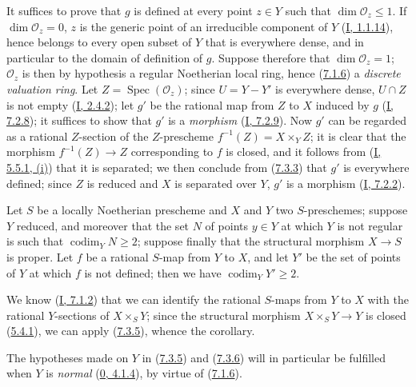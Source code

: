 It suffices to prove that $g$ is defined at every point $z\in Y$ such that
$\dim\mathcal{O}_z\leq1$. If $\dim\mathcal{O}_z=0$, $z$ is the generic point
of an irreducible component of $Y$ (\hyperref[I.1.1.14]{I, 1.1.14}), hence
belongs to every open subset of $Y$ that is everywhere dense, and in particular
to the domain of definition of $g$. Suppose therefore that $\dim\mathcal{O}_z=1$;
$\mathcal{O}_z$ is then by hypothesis a regular Noetherian local ring,
hence (\hyperref[II.7.1.6]{7.1.6}) a \emph{discrete valuation ring}.
Let $Z=\operatorname{Spec}(\mathcal{O}_z)$; since $U=Y-Y'$ is everywhere
dense, $U\cap Z$ is not empty (\hyperref[I.2.4.2]{I, 2.4.2}); let $g'$
be the rational map from $Z$ to $X$ induced by $g$
(\hyperref[I.7.2.8]{I, 7.2.8}); it suffices to show that $g'$ is a
\emph{morphism} (\hyperref[I.7.2.9]{I, 7.2.9}). Now $g'$ can be
regarded as a rational $Z$-section of the $Z$-prescheme
$f^{-1}(Z)=X\times_YZ$; it is clear that the morphism $f^{-1}(Z)\to Z$
corresponding to $f$ is closed, and it follows from
(\hyperref[I.5.5.1]{I, 5.5.1, (i)}) that it is separated; we then conclude from
(\hyperref[II.7.3.3]{7.3.3}) that $g'$ is everywhere defined; since $Z$ is
reduced and $X$ is separated over $Y$, $g'$ is a morphism
(\hyperref[I.7.2.2]{I, 7.2.2}).

\begin{corollary}[7.3.6]
\label{II.7.3.6}
Let $S$ be a locally Noetherian prescheme and $X$ and $Y$ two
$S$-preschemes; suppose $Y$ reduced, and moreover that the set $N$ of
points $y\in Y$ at which $Y$ is not regular is such that
$\operatorname{codim}_YN\geq2$; suppose finally that the structural morphism
$X\to S$ is proper. Let $f$ be a rational $S$-map from $Y$ to
$X$, and let $Y'$ be the set of points of $Y$ at which $f$ is not defined;
then we have $\operatorname{codim}_YY'\geq2$.
\end{corollary}

We know (\hyperref[I.7.1.2]{I, 7.1.2}) that we can identify the
rational $S$-maps from $Y$ to $X$ with the rational $Y$-sections
of $X\times_SY$; since the structural morphism $X\times_SY\to Y$ is closed
(\hyperref[II.5.4.1]{5.4.1}), we can apply
(\hyperref[II.7.3.5]{7.3.5}), whence the corollary.

\begin{remark}[7.3.7]
\label{II.7.3.7}
The hypotheses made on $Y$ in (\hyperref[II.7.3.5]{7.3.5}) and
(\hyperref[II.7.3.6]{7.3.6}) will in particular be fulfilled when $Y$
is \emph{normal} (\hyperref[0.4.1.4]{0, 4.1.4}), by virtue of
(\hyperref[II.7.1.6]{7.1.6}).
\end{remark}

